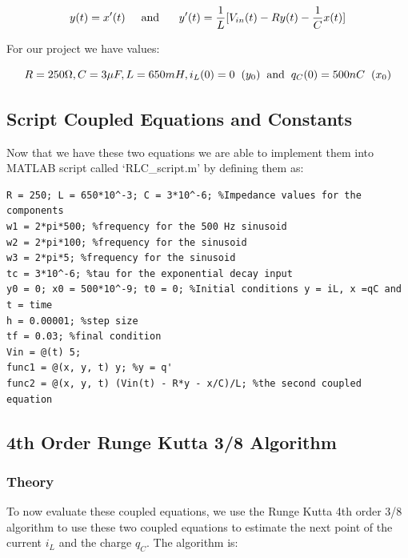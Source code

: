 \documentclass[11pt,a4paper]{article}
\begin{document}
\begin{equation}
	y(t) = x'(t) \text{\hspace{5mm}and \hspace{5mm}}y'(t) = \frac{1}{L}[V_{in}(t)  - Ry(t) - \frac{1}{C}x(t)]
\end{equation}

For our project we have values:

\begin{equation}
	R = 250 \Omega, C = 3 \mu F , L = 650 mH, i_L(0) = 0 \hspace{2mm} (y_0) \text{\hspace{2mm}and\hspace{2mm}} q_C(0) = 500nC \hspace{2mm} (x_0)
\end{equation}

\subsection{Script Coupled Equations and Constants}

Now that we have these two equations we are able to implement them into MATLAB script called `RLC\_script.m' by defining them as:

\begin{verbatim}
R = 250; L = 650*10^-3; C = 3*10^-6; %Impedance values for the components
w1 = 2*pi*500; %frequency for the 500 Hz sinusoid
w2 = 2*pi*100; %frequency for the sinusoid
w3 = 2*pi*5; %frequency for the sinusoid
tc = 3*10^-6; %tau for the exponential decay input
y0 = 0; x0 = 500*10^-9; t0 = 0; %Initial conditions y = iL, x =qC and t = time
h = 0.00001; %step size
tf = 0.03; %final condition
Vin = @(t) 5;
func1 = @(x, y, t) y; %y = q'
func2 = @(x, y, t) (Vin(t) - R*y - x/C)/L; %the second coupled equation
\end{verbatim}

\subsection{4th Order Runge Kutta 3/8 Algorithm}
\subsubsection{Theory}

To now evaluate these coupled equations, we use the Runge Kutta 4th order 3/8 algorithm to use these two coupled equations to estimate the next point of the current $i_L$ and the charge $q_C$. The algorithm is:
\end{document}
